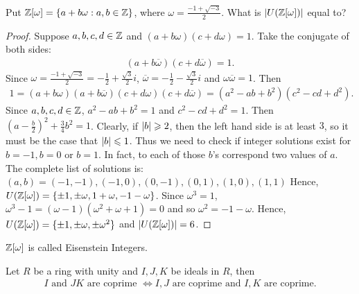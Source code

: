 \begin{exercise}{}{}
    Put $\mathbb{Z}[\omega]=\{a+b\omega:a,b\in\mathbb{Z}\}$, where $\omega=\frac{-1+\sqrt{-3}}{2}$. What is $|U(\mathbb{Z}[\omega])|$ equal to? 
\end{exercise}

\begin{proof}
   Suppose $a,b,c,d\in\mathbb{Z}$ and $(a+b\omega)(c+d\omega)=1$. 
   Take the conjugate of both sides: 
   \begin{align*}
        (a+b\overline{\omega})(c+d\overline{\omega})=1.
   \end{align*}
   Since $\omega=\frac{-1+\sqrt{-3}}{2}=-\frac{1}{2}+\frac{\sqrt{3}}{2}i$, 
   $\overline{\omega}=-\frac{1}{2}-\frac{\sqrt{3}}{2}i$ and $\omega\overline{\omega}=1$.
   Then
   \begin{align*}
    1=(a+b\omega)(a+b\overline{\omega})(c+d\omega)(c+d\overline{\omega})=(a^2-ab+b^2)(c^2-cd+d^2).
   \end{align*}
   Since $a,b,c,d\in\mathbb{Z}$, $a^2-ab+b^2=1$ and $c^2-cd+d^2=1$.
   Then $(a-\frac{b}{2})^2+\frac{3}{4}b^2=1$. 
   Clearly, if $|b| \geqslant 2$, 
   then the left hand side is at least $3$, 
   so it must be the case that $|b|\leqslant 1$.
   Thus we need to check if integer solutions exist for 
   $b = -1, b = 0$ or $b = 1$.
   In fact, to each of those $b$'s correspond two values of $a$.
   The complete list of solutions is:
   $(a, b) = (-1, -1), (-1, 0), (0, -1), (0, 1), (1, 0), (1, 1)$
   Hence, $U(\mathbb{Z}[\omega])=\{\pm 1, \pm \omega, 1+\omega, -1-\omega\}$.
   Since $\omega^3=1$, $\omega^3-1=(\omega-1)(\omega^2+\omega+1)=0$ and so $\omega^2 = -1-\omega$.
   Hence, $U(\mathbb{Z}[\omega])=\{\pm 1, \pm \omega, \pm \omega^2\}$ and $|U(\mathbb{Z}[\omega])|=6$.
\end{proof}

\begin{remark}
    $\mathbb{Z}[\omega]$ is called Eisenstein Integers. 
\end{remark}

\begin{exercise}{}{}
    Let $R$ be a ring with unity and $I,J,K$ be ideals in $R$, then 
    \begin{align*}
        I \text{ and } JK \text{ are coprime }  \Leftrightarrow I,J \text{ are coprime and } I,K \text{ are coprime}.  
    \end{align*}
\end{exercise}

